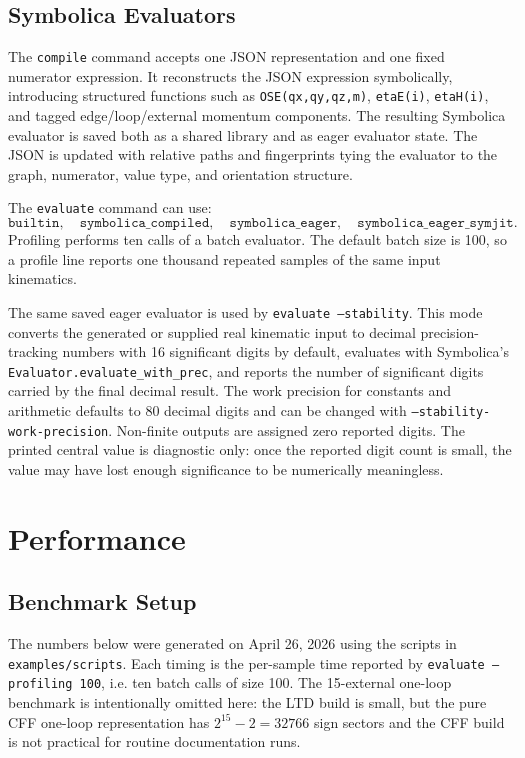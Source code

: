 \documentclass[11pt,a4paper]{report}
\begin{document}
\section{Symbolica Evaluators}

The \texttt{compile} command accepts one JSON representation and one fixed
numerator expression.  It reconstructs the JSON expression symbolically,
introducing structured functions such as \texttt{OSE(qx,qy,qz,m)},
\texttt{etaE(i)}, \texttt{etaH(i)}, and tagged edge/loop/external momentum
components.  The resulting Symbolica evaluator is saved both as a shared
library and as eager evaluator state.  The JSON is updated with relative paths
and fingerprints tying the evaluator to the graph, numerator, value type, and
orientation structure.

The \texttt{evaluate} command can use:
\[
\texttt{builtin},\quad
\texttt{symbolica\_compiled},\quad
\texttt{symbolica\_eager},\quad
\texttt{symbolica\_eager\_symjit}.
\]
Profiling performs ten calls of a batch evaluator.  The default batch size is
100, so a profile line reports one thousand repeated samples of the same input
kinematics.

The same saved eager evaluator is used by
\texttt{evaluate --stability}.  This mode converts the generated or supplied
real kinematic input to decimal precision-tracking numbers with 16 significant
digits by default, evaluates with Symbolica's
\texttt{Evaluator.evaluate\_with\_prec}, and reports the number of significant
digits carried by the final decimal result.  The work precision for constants
and arithmetic defaults to 80 decimal digits and can be changed with
\texttt{--stability-work-precision}.  Non-finite outputs are assigned zero
reported digits.  The printed central value is diagnostic only: once the
reported digit count is small, the value may have lost enough significance to
be numerically meaningless.

\chapter{Performance}

\section{Benchmark Setup}

The numbers below were generated on April 26, 2026 using the scripts in
\texttt{examples/scripts}.  Each timing is the per-sample time reported by
\texttt{evaluate --profiling 100}, i.e. ten batch calls of size 100.  The
15-external one-loop benchmark is intentionally omitted here: the LTD build is
small, but the pure CFF one-loop representation has \(2^{15}-2=32766\) sign
sectors and the CFF build is not practical for routine documentation runs.
\end{document}
